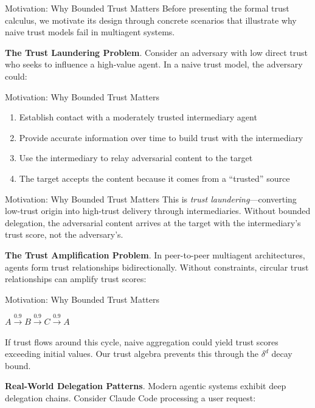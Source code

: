 \documentclass[
  ignorenonframetext,
]{beamer}
\begin{document}
\begin{frame}[allowframebreaks]{Motivation: Why Bounded Trust Matters}
\protect{}\label{sec:trust-motivation}
Before presenting the formal trust calculus, we motivate its design
through concrete scenarios that illustrate why naive trust models fail
in multiagent systems.

\textbf{The Trust Laundering Problem}. Consider an adversary with low
direct trust who seeks to influence a high-value agent. In a naive trust
model, the adversary could:

\end{frame}

\begin{frame}[allowframebreaks]{Motivation: Why Bounded Trust Matters}
\begin{enumerate}
\item Establish contact with a moderately trusted intermediary agent
\item Provide accurate information over time to build trust with the intermediary
\item Use the intermediary to relay adversarial content to the target
\item The target accepts the content because it comes from a ``trusted'' source
\end{enumerate}

\end{frame}

\begin{frame}[allowframebreaks]{Motivation: Why Bounded Trust Matters}
This is \textit{trust laundering}---converting low-trust origin into
high-trust delivery through intermediaries. Without bounded delegation,
the adversarial content arrives at the target with the intermediary's
trust score, not the adversary's.

\textbf{The Trust Amplification Problem}. In peer-to-peer multiagent
architectures, agents form trust relationships bidirectionally. Without
constraints, circular trust relationships can amplify trust scores:

\end{frame}

\begin{frame}[allowframebreaks]{Motivation: Why Bounded Trust Matters}
\begin{center}
$A \xrightarrow{0.9} B \xrightarrow{0.9} C \xrightarrow{0.9} A$
\end{center}

If trust flows around this cycle, naive aggregation could yield trust
scores exceeding initial values. Our trust algebra prevents this through
the \(\delta^d\) decay bound.

\textbf{Real-World Delegation Patterns}. Modern agentic systems exhibit
deep delegation chains. Consider Claude Code processing a user request:

\end{frame}
\end{document}
